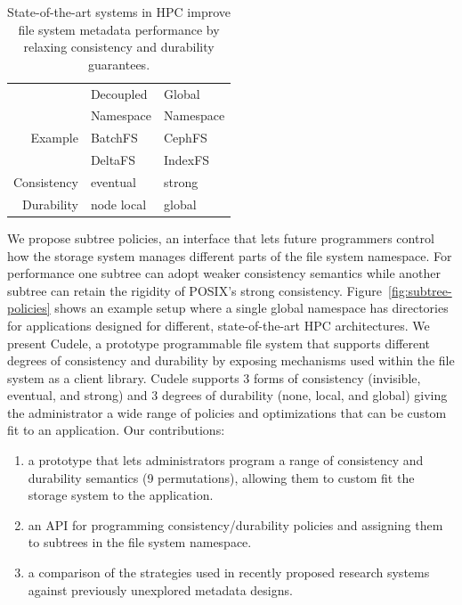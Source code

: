 \begin{table}
\begin{tabular}{ r | l | l }
              & Decoupled & Global    \\
              & Namespace & Namespace \\\hline
  Example     & BatchFS~\cite{zheng:pdsw2014-batchfs} & CephFS~\cite{weil:sc2004-dyn-metadata} \\
              & DeltaFS~\cite{zheng:pdsw2015-deltafs} & IndexFS~\cite{ren:sc2014-indexfs}      \\
  Consistency & eventual & strong     \\
  Durability  & node local & global  \\
\end{tabular}
\caption{State-of-the-art systems in HPC improve file system metadata
performance by relaxing consistency and durability
guarantees.\label{table:namespaces}}
\end{table}

We propose subtree policies, an interface that lets future programmers control
how the storage system manages different parts of the file system namespace.  For performance one
subtree can adopt weaker consistency semantics while another subtree can retain
the rigidity of POSIX's strong consistency. Figure~\ref{fig:subtree-policies}
shows an example setup where a single global namespace has directories for
applications designed for different, state-of-the-art HPC architectures.  We
present Cudele, a prototype programmable file system that supports different
degrees of consistency and durability by exposing mechanisms used within the
file system as a client library.  Cudele supports 3 forms of consistency
(invisible, eventual, and strong) and 3 degrees of durability (none, local, and
global) giving the administrator a wide range of policies and optimizations
that can be custom fit to an application. Our contributions: 

\begin{enumerate}

  \item a prototype that lets administrators program a range of
  consistency and durability semantics (9 permutations), allowing them to custom
  fit the storage system to the application.

  \item an API for programming consistency/durability policies and assigning
  them to subtrees in the file system namespace.

  \item a comparison of the strategies used in recently proposed research systems against
  previously unexplored metadata designs.

\end{enumerate}

